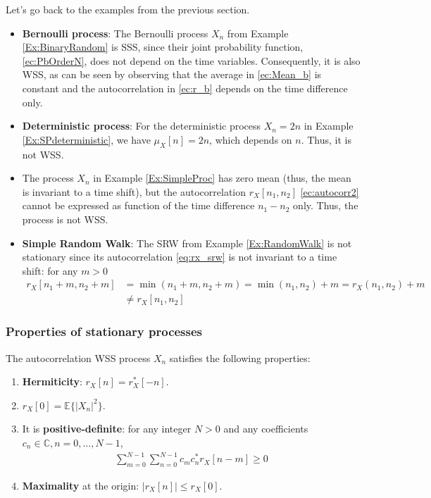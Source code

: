 \begin{example}

Let's go back to the examples from the previous section.
\begin{itemize}
\item \textbf{Bernoulli process}: The Bernoulli process $X_n$ from Example \ref{Ex:BinaryRandom} is SSS, since their joint probability function, \eqref{ec:PbOrderN}, does not depend on the time variables. Consequently, it is also WSS, as can be seen by observing that the average in \eqref{ec:Mean_b} is constant and the autocorrelation in \eqref{ec:r_b} depends on the time difference only.

\item \textbf{Deterministic process}: For the deterministic process $X_n=2n$ in Example \ref{Ex:SPdeterministic}, we have $\mu_X[n]=2n$, which depends on $n$. Thus, it is not WSS. 

\item The process $X_n$ in Example \ref{Ex:SimpleProc} has zero mean (thus, the mean is invariant to a time shift), but the autocorrelation $r_X[n_1, n_2]$ \eqref{ec:autocorr2} cannot be expressed as function of the time difference $n_1 - n_2$ only. Thus, the process is not WSS.

\item \textbf{Simple Random Walk}: The SRW from Example \ref{Ex:RandomWalk} is not stationary since its autocorrelation \eqref{eq:rx_srw} is not invariant to a time shift: for any $m>0$
\begin{align}
r_X[n_1 + m, n_2 + m] &= \min(n_1 + m, n_2 + m) = \min(n_1, n_2) + m = r_X(n_1, n_2) + m   \nonumber\\
                      &\neq r_X[n_1, n_2]
\end{align}
\end{itemize}
\end{example}

\subsubsection{Properties of stationary processes}

\begin{theorem}

The autocorrelation WSS process $X_n$ satisfies the following properties:
\begin{enumerate}
\item \textbf{Hermiticity}: $r_X[n]=r_X^*[-n]$. 
\item $r_X[0]=\mathbb{E}\{|X_n|^2\}$.
\item It is \textbf{positive-definite}: for any integer $N>0$ and any coefficients $c_n \in 
\mathbb{C}, n=0,\ldots,N-1$, 
\begin{align}
\label{sp:pos_def}
\sum_{m=0}^{N-1}\sum_{n=0}^{N-1} c_m c_n^* r_X[n-m] \ge 0
\end{align}
\item \textbf{Maximality} at the origin: $|r_X[n]|\le r_X[0]$.
\end{enumerate}
\end{theorem}

